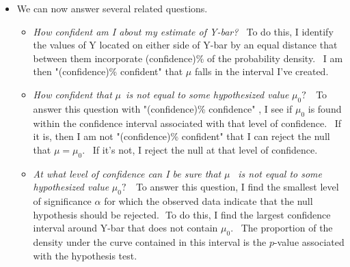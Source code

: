 \documentclass[11pt]{article}
\begin{document}
\begin{itemize}
\item We can now answer several related questions. \ 

\begin{itemize}
\item \textit{How confident am I about my estimate of Y-bar? \ }To do this,
I identify the values of Y located on either side of Y-bar by an equal
distance that between them incorporate (confidence)\% of the probability
density. \ I am then "(confidence)\% confident" that $\mu $ falls in the
interval I've created.

\item \textit{How confident that }$\mu $\textit{\ is not equal to some
hypothesized value }$\mu _{0}?$\textit{\ \ }To answer this question with
"(confidence)\% confidence" , I see if $\mu _{0}$ is found within the
confidence interval associated with that level of confidence. \ If it is,
then I am not "(confidence)\% confident" that I can reject the null that $%
\mu =\mu _{0}.$ \ If it's not, I reject the null at that level of confidence.

\item \textit{At what level of confidence can I be sure that }$\mu $\textit{%
\ is not equal to some hypothesized value }$\mu _{0}?$\textit{\ \ }To answer
this question, I find the smallest level of significance $\alpha $ for which
the observed data indicate that the null hypothesis should be rejected.$\ \
\ $To do this, I find the largest confidence interval around Y-bar that does
not contain $\mu _{0}.$ \ The proportion of the density under the curve
contained in this interval is the $p$-value associated with the hypothesis
test.
\end{itemize}
\end{itemize}
\end{document}
